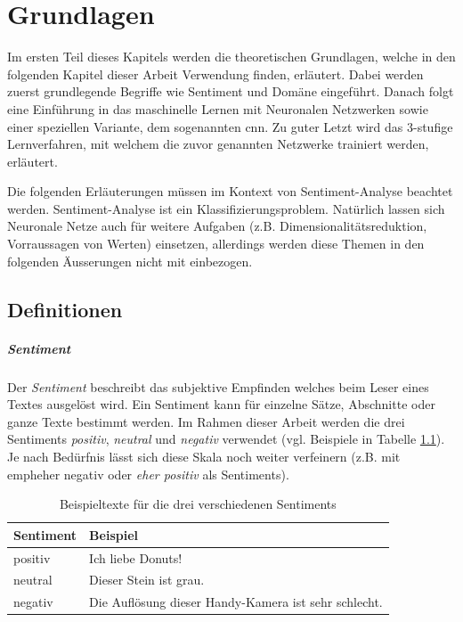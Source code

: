 \chapter{Grundlagen}
Im ersten Teil dieses Kapitels werden die theoretischen Grundlagen, welche in den folgenden Kapitel dieser Arbeit Verwendung finden, erläutert. Dabei werden zuerst grundlegende Begriffe wie Sentiment und Domäne eingeführt. Danach folgt eine Einführung in das maschinelle Lernen mit Neuronalen Netzwerken sowie einer speziellen Variante, dem sogenannten \gls{cnn}. Zu guter Letzt wird das 3-stufige Lernverfahren, mit welchem die zuvor genannten Netzwerke trainiert werden, erläutert.

Die folgenden Erläuterungen müssen im Kontext von Sentiment-Analyse beachtet werden. Sentiment-Analyse ist ein Klassifizierungsproblem. Natürlich lassen sich Neuronale Netze auch für weitere Aufgaben (z.B. Dimensionalitätsreduktion, Vorraussagen von Werten) einsetzen, allerdings werden diese Themen in den folgenden Äusserungen nicht mit einbezogen.

\section{Definitionen}
\paragraph{Sentiment}
Der \emph{Sentiment} beschreibt das subjektive Empfinden welches beim Leser eines Textes ausgelöst wird. Ein Sentiment kann für einzelne Sätze, Abschnitte oder ganze Texte bestimmt werden. Im Rahmen dieser Arbeit werden die drei Sentiments \emph{positiv}, \emph{neutral} und \emph{negativ} verwendet (vgl. Beispiele in Tabelle \ref{basics:sentiments_example_table}). Je nach Bedürfnis lässt sich diese Skala noch weiter verfeinern (z.B. mit emph{eher negativ} oder \emph{eher positiv} als Sentiments).

\begin{table}[h]
  \centering
  \begin{tabular}{ll}
    \toprule
    Sentiment & Beispiel\\
    \midrule
    positiv & Ich liebe Donuts!\\
    neutral & Dieser Stein ist grau.\\
    negativ & Die Auflösung dieser Handy-Kamera ist sehr schlecht.\\
    \bottomrule
  \end{tabular}
  \caption{Beispieltexte für die drei verschiedenen Sentiments}
  \label{basics:sentiments_example_table}
\end{table}

